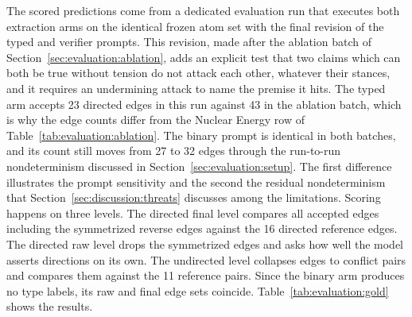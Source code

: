 The scored predictions come from a dedicated evaluation run that executes both
extraction arms on the identical frozen atom set with the final revision of
the typed and verifier prompts. This revision, made after the ablation batch
of Section~\ref{sec:evaluation:ablation}, adds an explicit test that two
claims which can both be true without tension do not attack each other,
whatever their stances, and it requires an undermining attack to name the
premise it hits. The typed arm accepts 23
directed edges in this run against 43 in the ablation batch, which is why the
edge counts differ from the Nuclear Energy row of
Table~\ref{tab:evaluation:ablation}. The binary prompt is identical in both
batches, and its count still moves from 27 to 32 edges through the
run-to-run nondeterminism discussed in Section~\ref{sec:evaluation:setup}.
The first difference illustrates the prompt sensitivity and the second the
residual nondeterminism that Section~\ref{sec:discussion:threats} discusses
among the limitations. Scoring happens on
three levels. The directed final level compares all accepted edges including
the symmetrized reverse edges against the 16 directed reference edges. The directed
raw level drops the symmetrized edges and asks how well the model asserts
directions on its own. The undirected level collapses edges to conflict pairs
and compares them against the 11 reference pairs. Since the binary arm produces no
type labels, its raw and final edge sets coincide.
Table~\ref{tab:evaluation:gold} shows the results.

\begin{table}[tb]
  \centering
  \caption{Precision, recall, and F1 of both extraction arms against the
  manual reference annotation on Nuclear Energy. ``$n$'' is the number of predicted edges or
  pairs, TP the number of true positives. The reference annotation contains 16
  directed edges and 11 undirected conflict pairs.}
  \label{tab:evaluation:gold}
  \small
  
\end{table}


